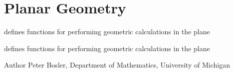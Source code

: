 \hypertarget{group___plane_geom}{\section{Planar Geometry}
\label{group___plane_geom}
}


defines functions for performing geometric calculations in the plane  


defines functions for performing geometric calculations in the plane 

\begin{DoxyAuthor}{Author}
Peter Bosler, Department of Mathematics, University of Michigan 
\end{DoxyAuthor}

